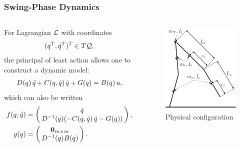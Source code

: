 \documentclass{beamer}
\begin{document}
\begin{frame}
  \frametitle{Swing-Phase Dynamics}
  \begin{columns}[t]
    \begin{column}{.55\textwidth}
      For Lagrangian $\mathcal{L}$ with coordinates
      \begin{align*}
        (q^{T}, \dot q^{T})^{T} \in T\mathcal{Q},
      \end{align*}
      the principal of least action allows one to construct a dynamic model:
      \begin{align*}
        D(q) \, \ddot q + C(q, \dot q) \, \dot q + G(q) = B(q) \, u,
      \end{align*}
      which can also be written
      \begin{align*}
        f(\q, \dq) &= \left(\!\!\begin{array}{c}
        \dq\\
        \D^{-1}(\q) (-\C(\q, \dq) \, \dq - \G(\q))
        \end{array}\!\!\right),\\
        g(\q) &= \left(\!\!\begin{array}{c}
        \mathbf{0}_{m \times m}\\
        \D^{-1}(\q) B(\q)
        \end{array}\!\!\right).
      \end{align*}
    \end{column}\!\!
    \begin{column}{.45\textwidth}
      \begin{figure}
        \centering
        \vspace{-10mm}
        \caption{Physical configuration}
        \includegraphics[width = 1.0\columnwidth]{robot_config}

\end{figure}
\end{column}
\end{columns}
\end{frame}
\end{document}
